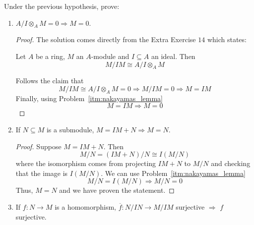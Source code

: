 \begin{problem}
    Under the previous hypothesis, prove:
    \begin{enumerate}[label=(\theproblem.\arabic*),ref=\theproblem.\arabic*]
        \item \label{itm:2_1} $A/I \otimes_A M = 0 \Rightarrow M = 0$.
            \begin{sol}
                \begin{proof}
                    The solution comes directly from the Extra Exercise $14$ which states:
                    \begin{claim}
                        Let $A$ be a ring, $M$ an $A$-module and $I \subseteq A$ an ideal.
                        Then
                        \[
                            M/IM \cong A/I \otimes_A M
                        \]
                    \end{claim}
                    Follows the claim that
                    \[
                        M/IM \cong A/I \otimes_A M = 0 \Rightarrow M/IM = 0 \Rightarrow M = IM
                    \]
                    Finally, using Problem~\ref{itm:nakayamas_lemma}
                    \[
                        M = IM \Rightarrow M = 0
                    \]
                \end{proof}
            \end{sol}
        \item \label{itm:2_2} If $N \subseteq M$ is a submodule, $M = IM + N \Rightarrow M = N$.
            \begin{sol}
                \begin{proof}
                    Suppose $M = IM + N$.
                    Then
                    \[
                        M / N = (IM + N) / N \cong I (M / N)
                    \]
                    where the isomorphism comes from projecting $IM+N$ to $M/N$
                    and checking that the image is $I (M/N)$.
                    We can use Problem~\ref{itm:nakayamas_lemma}
                    \[
                        M/N = I (M / N) \Rightarrow M/N = 0
                    \]
                    Thus, $M = N$ and we have proven the statement.
                \end{proof}
            \end{sol}
        \item If $f: N \rightarrow M$ is a homomorphism, $\overline{f}: N/IN \rightarrow M/IM$ surjective $\Rightarrow$ $f$ surjective.
            \begin{sol}

\end{sol}
\end{enumerate}
\end{problem}
